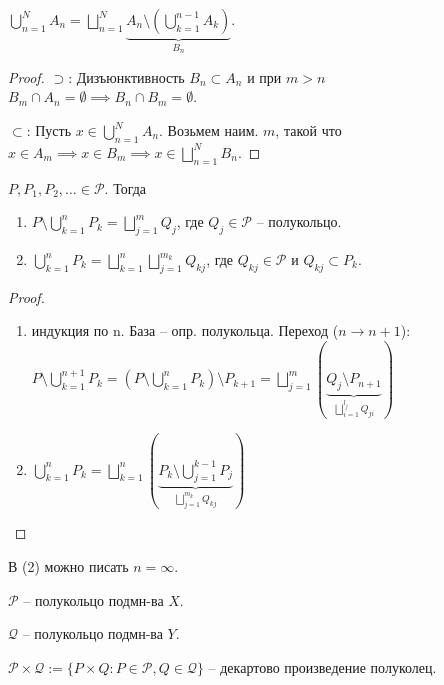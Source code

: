 \begin{lemma}
    $\bigcup_{n=1}^{N} A_n = \bigsqcup_{n=1}^{N}\underbrace{A_n \setminus \left(\bigcup_{k=1}^{n-1}A_k\right)}_{B_n}$.
\end{lemma}
\begin{proof}
    $\supset$: Дизъюнктивность $B_n \subset A_n $ и при $m > n$ $B_m \cap A_n = \emptyset \implies B_n \cap B_m = \emptyset$.
    
    $\subset$: Пусть $x \in \bigcup_{n=1}^{N} A_n$. Возьмем наим. $m$, такой что $x \in A_m \implies x \in B_m \implies x \in \bigsqcup_{n=1}^{N} B_n$.
\end{proof}

\begin{theorem}
    $P, P_1, P_2, \dots \in \mathcal{P}$. Тогда 

    \begin{enumerate}
        \item $P \setminus \bigcup_{k=1}^{n} P_k = \bigsqcup_{j=1}^m Q_j$, где $Q_j \in \mathcal{P}$ -- полукольцо.
        \item $\bigcup_{k=1}^{n} P_k = \bigsqcup_{k=1}^{n} \bigsqcup_{j=1}^{m_k} Q_{kj}$, где $Q_{kj} \in \mathcal{P}$ и $Q_{kj} \subset P_k$. 
    \end{enumerate}
\end{theorem}

\begin{proof}
    \begin{enumerate}
        \item индукция по n. База -- опр. полукольца. Переход ($n \rightarrow n+1$): \\ $P \setminus \bigcup_{k=1}^{n+1}P_k = \left(P \setminus \bigcup_{k=1}^nP_k\right) \setminus P_{k+1} = \bigsqcup_{j=1}^{m} \left(\underbrace{Q_j \setminus P_{n+1}}_{\bigsqcup_{i=1}^{l_j}Q_{ji}}\right)$
        \item $\bigcup_{k=1}^{n} P_k = \bigsqcup_{k=1}^{n} \left(\underbrace{P_k \setminus \bigcup_{j=1}^{k-1} P_j}_{\bigsqcup_{j=1}^{m_k} Q_{kj}}\right)$
    \end{enumerate}
\end{proof}

\begin{remark}
    В (2) можно писать $n = \infty$.
\end{remark}

\begin{definition}
    $\mathcal{P}$ -- полукольцо подмн-ва $X$.

    $\mathcal{Q}$ -- полукольцо подмн-ва $Y$.

    $\mathcal{P} \times \mathcal{Q} := \{P \times Q : P \in \mathcal{P}, Q \in \mathcal{Q}\}$ -- декартово произведение полуколец.
\end{definition}

